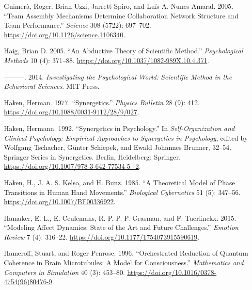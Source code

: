 \documentclass[
  letterpaper,
]{scrbook}
\newlength{\cslhangindent}
\newlength{\cslentryspacingunit} %
\newenvironment{CSLReferences}[2] %
 {%
  \setlength{\parindent}{0pt}
  \ifodd #1
  \let\oldpar\par
  \def\par{\hangindent=\cslhangindent\oldpar}
  \fi
  \setlength{\parskip}{#2\cslentryspacingunit}
 }%
 {}
\begin{document}
\begin{CSLReferences}{1}{0}
\leavevmode{}%
Guimerà, Roger, Brian Uzzi, Jarrett Spiro, and Luís A. Nunes Amaral.
2005. {``Team {Assembly Mechanisms Determine Collaboration Network
Structure} and {Team Performance}.''} \emph{Science} 308 (5722):
697--702. \url{https://doi.org/10.1126/science.1106340}.

\leavevmode{}%
Haig, Brian D. 2005. {``An Abductive Theory of Scientific Method.''}
\emph{Psychological Methods} 10 (4): 371--88.
\url{https://doi.org/10.1037/1082-989X.10.4.371}.

\leavevmode{}%
---------. 2014. \emph{Investigating the {Psychological World}:
{Scientific Method} in the {Behavioral Sciences}}. {MIT Press}.

\leavevmode{}%
Haken, Herman. 1977. {``Synergetics.''} \emph{Physics Bulletin} 28 (9):
412. \url{https://doi.org/10.1088/0031-9112/28/9/027}.

\leavevmode{}%
Haken, Hermann. 1992. {``Synergetics in {Psychology}.''} In
\emph{Self-{Organization} and {Clinical Psychology}: {Empirical
Approaches} to {Synergetics} in {Psychology}}, edited by Wolfgang
Tschacher, Günter Schiepek, and Ewald Johannes Brunner, 32--54. Springer
{Series} in {Synergetics}. {Berlin, Heidelberg}: {Springer}.
\url{https://doi.org/10.1007/978-3-642-77534-5_2}.

\leavevmode{}%
Haken, H., J. A. S. Kelso, and H. Bunz. 1985. {``A Theoretical Model of
Phase Transitions in Human Hand Movements.''} \emph{Biological
Cybernetics} 51 (5): 347--56. \url{https://doi.org/10.1007/BF00336922}.

\leavevmode{}%
Hamaker, E. L., E. Ceulemans, R. P. P. P. Grasman, and F. Tuerlinckx.
2015. {``Modeling {Affect Dynamics}: {State} of the {Art} and {Future
Challenges}.''} \emph{Emotion Review} 7 (4): 316--22.
\url{https://doi.org/10.1177/1754073915590619}.

\leavevmode{}%
Hameroff, Stuart, and Roger Penrose. 1996. {``Orchestrated Reduction of
Quantum Coherence in Brain Microtubules: {A} Model for Consciousness.''}
\emph{Mathematics and Computers in Simulation} 40 (3): 453--80.
\url{https://doi.org/10.1016/0378-4754(96)80476-9}.


\end{CSLReferences}
\end{document}
